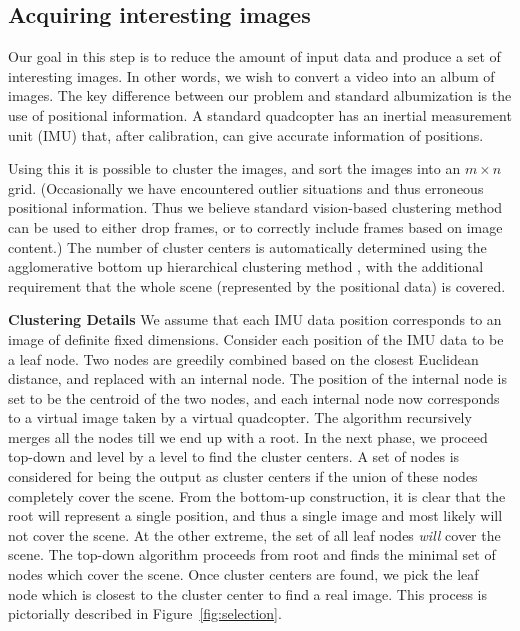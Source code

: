 \documentclass[10pt,twocolumn,letterpaper]{article}
\begin{document}
\subsection{Acquiring interesting images}
\label{sec:selection}
Our goal in this step is to reduce the amount of input data and
produce a set of interesting images.  In other words, we wish to
convert a video into an album of images.  The key difference between
our problem and standard albumization \cite{Aner, Lee} is the use of 
positional information.  A standard quadcopter has an inertial
measurement unit (IMU) that, after calibration, can give accurate
information of positions.

Using this it is possible to cluster the images, and sort the images
into an $m\times n$ grid.  (Occasionally we have encountered outlier
situations and thus erroneous positional information.  Thus we believe
standard vision-based clustering method can be used to either drop
frames, or to correctly include frames based on image content.)  The
number of cluster centers is automatically determined using the
agglomerative bottom up hierarchical clustering method \cite{Lior}, with the
additional requirement that the whole scene (represented by the
positional data) is covered.  

{\bf Clustering Details} We assume that each IMU data position
corresponds to an image of definite fixed dimensions.  Consider each
position of the IMU data to be a leaf node. Two nodes are greedily
combined based on the closest Euclidean distance, and replaced with an
internal node.  The position of the internal node is set to be the
centroid of the two nodes, and each internal node now corresponds to a
virtual image taken by a virtual quadcopter.  The algorithm
recursively merges all the nodes till we end up with a root.  In the
next phase, we proceed top-down and level by a level to find the
cluster centers.  A set of nodes is considered for being the output as
cluster centers if the union of these nodes completely cover the
scene. From the bottom-up construction, it is clear that the root will
represent a single position, and thus a single image and most likely
will not cover the scene.  At the other extreme, the set of all leaf
nodes \emph{will} cover the scene.  The top-down algorithm proceeds
from root and finds the minimal set of nodes which cover the scene.
Once cluster centers are found, we pick the leaf node which is closest
to the cluster center to find a real image.
This process is pictorially described in
Figure~\ref{fig:selection}.
\end{document}
